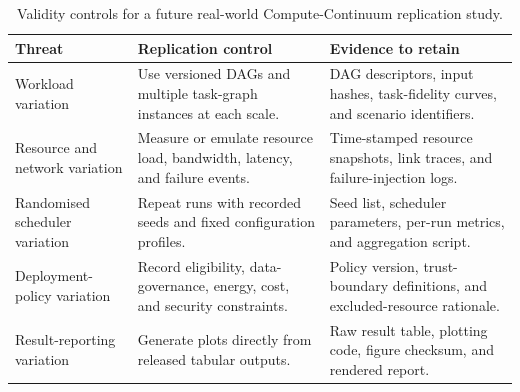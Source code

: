 \begin{table}[t]
\centering
\caption{Validity controls for a future real-world Compute-Continuum replication study.}
\label{tab:validity_controls}
\small
\begin{tabular}{p{}p{}p{}}
\toprule
\textbf{Threat} & \textbf{Replication control} & \textbf{Evidence to retain} \\
\midrule
Workload variation & Use versioned DAGs and multiple task-graph instances at each scale. & DAG descriptors, input hashes, task-fidelity curves, and scenario identifiers. \\
\addlinespace
Resource and network variation & Measure or emulate resource load, bandwidth, latency, and failure events. & Time-stamped resource snapshots, link traces, and failure-injection logs. \\
\addlinespace
Randomised scheduler variation & Repeat runs with recorded seeds and fixed configuration profiles. & Seed list, scheduler parameters, per-run metrics, and aggregation script. \\
\addlinespace
Deployment-policy variation & Record eligibility, data-governance, energy, cost, and security constraints. & Policy version, trust-boundary definitions, and excluded-resource rationale. \\
\addlinespace
Result-reporting variation & Generate plots directly from released tabular outputs. & Raw result table, plotting code, figure checksum, and rendered report. \\
\bottomrule
\end{tabular}
\end{table}
